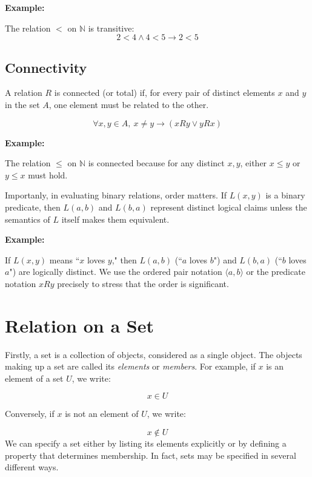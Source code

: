\documentclass[12pt,a4paper,openany]{article}
\begin{document}
\textbf{Example:}

The relation $<$ on $\mathbb{N}$ is transitive: 
$$2 < 4 \land 4 < 5 \to 2 < 5$$

\subsection{Connectivity}\label{connectivity}

A relation $R$ is connected (or total) if, for every pair of distinct elements $x$ and $y$ in the set $A$, one element must be related to the other.

$$\forall x,y \in A,\ x \neq y \to (xRy \lor yRx)$$

\textbf{Example:}

The relation $\leq$ on $\mathbb{N}$ is connected because for any distinct $x,y$, either $x \leq y$ or $y \leq x$ must hold.

Importanly, in evaluating binary relations, order matters. If $L(x,y)$ is a binary predicate, then $L(a,b)$ and $L(b,a)$ represent distinct logical claims unless the semantics of $L$ itself makes them equivalent.

\textbf{Example:}

If $L(x,y)$ means ``$x$ loves $y$," then $L(a,b)$ (``$a$ loves $b$") and $L(b,a)$ (``$b$ loves $a$") are logically distinct. 
We use the ordered pair notation $\langle a, b \rangle$ or the predicate notation $xRy$ precisely to stress that the order is significant.

\section{Relation on a Set}

Firstly, a set is a collection of objects, considered as a single object. The objects making up a set are called its \textit{elements} or \textit{members}. 
For example, if $x$ is an element of a set $U$, we write:   

$$
x \in U
$$  

Conversely, if $x$ is not an element of $U$, we write:   

$$
x \notin U
$$  
We can specify a set either by listing its elements explicitly or by defining a property that determines membership. In fact, sets may be specified in several different ways. 
\end{document}
